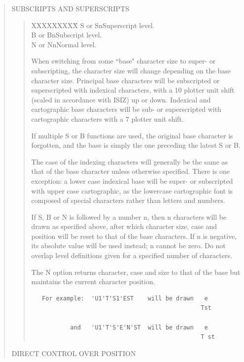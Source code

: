 \documentclass[11pt]{article}
\renewcommand{\_}{{\tt\char'137}}     %
\begin{document}
\begin{quote}
SUBSCRIPTS AND SUPERSCRIPTS

\begin{quote}
\begin{tabbing}
XXXXXXXXX\=\kill
S or Sn\>Superscript level.\\
B or Bn\>Subscript level.\\
N or Nn\>Normal level.
\end{tabbing}

When switching from some ``base" character size to super- or
subscripting, the character size will change depending on
the base character size.  Principal base characters will be
subscripted or superscripted with indexical characters, with
a 10 plotter unit shift (scaled in accordance with ISIZ) up
or down.  Indexical and cartographic base characters will be
sub- or superscripted with cartographic characters with a
7 plotter unit shift.

If multiple S or B functions are used, the original base
character is forgotten, and the base is simply the one
preceding the latest S or B.

The case of the indexing characters will generally be the
same as that of the base character unless otherwise specified.
There is one exception: a lower case indexical base will be
super- or subscripted with upper case cartographic, as the
lowercase cartographic font is composed of special characters
rather than letters and numbers.

If S, B or N is followed by a number n, then n characters will
be drawn as specified above, after which character size, case
and position will be reset to that of the base characters.
If n is negative, its absolute value will be used instead;  n
cannot be zero.  Do not overlap level definitions given for a
specified number of characters.

The N option returns character, case and size to that of the
base but maintains the current character position.

\begin{verbatim}
   For example:  'U1'T'S1'EST    will be drawn   e
                                                Tst

           and   'U1'T'S'E'N'ST  will be drawn   e
                                                T st
\end{verbatim}
\end{quote}

DIRECT CONTROL OVER POSITION


\end{quote}
\end{document}

